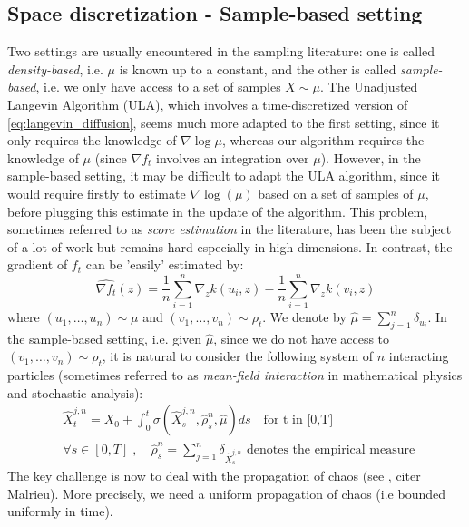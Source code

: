 

\subsection{Space discretization - Sample-based setting}

Two settings are usually encountered in the sampling literature: one is called \textit{density-based}, i.e. $\mu$ is known up to a constant, and the other is called \textit{sample-based}, i.e. we only have access to a set of samples $X \sim \mu$.
The Unadjusted Langevin Algorithm (ULA), which involves a time-discretized version of \eqref{eq:langevin_diffusion}, seems much more adapted to the first setting, since it only requires the knowledge of $\nabla \log \mu$, whereas our algorithm requires the knowledge of $\mu$ (since $\nabla f_t$ involves an integration over $\mu$). However, in the sample-based setting, it may be difficult to adapt the ULA algorithm, since it would require firstly to estimate $\nabla \log(\mu)$ based on a set of samples of $\mu$, before plugging this estimate in the update of the algorithm. This problem, sometimes referred to as \textit{score estimation} in the literature, has been the subject of a lot of work but remains hard especially in high dimensions. In contrast, the gradient of $f_t$ can be 'easily' estimated by:
\begin{equation}
\widehat{\nabla f_t}(z)= \frac{1}{n}\sum_{i=1}^{n}\nabla_{z}k(u_i,z) -\frac{1}{n}\sum_{i=1}^{n}\nabla_{z}k(v_i,z) 
\end{equation}
where $(u_1, \dots, u_n)\sim \mu$ and $(v_1, \dots, v_n)\sim \rho_t$. We denote by $\widehat{ \mu}=\sum_{j=1}^{n}\delta_{u_i}$. In the sample-based setting, i.e. given $\widehat{\mu}$, since we do not have access to $(v_1, \dots, v_n)\sim \rho_t$, it is natural to consider the following system of $n$ interacting particles (sometimes referred to as \textit{mean-field interaction} in mathematical physics and stochastic analysis):
\begin{align}\label{eq:sample_based_process}
&\widehat{X}_t^{j,n}=X_{0}+\int_{0}^t \sigma(\widehat{X}_s^{j,n}, \widehat{\rho}_s^n, \widehat{\mu})ds \quad \text{for t in [0,T]}\\
&\forall s \in [0,T]\;,\quad \widehat{\rho}_s^n=\sum_{j=1}^{n} \delta_{\widehat{X}_s^{j,n}} \text{ denotes the empirical measure } 
\end{align}
The key challenge is now to deal with the propagation of chaos (see \cite{sznitman1991topics}, citer Malrieu). More precisely, we need a uniform propagation of chaos (i.e bounded uniformly in time).


